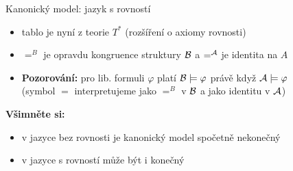 \documentclass{beamer}
\begin{document}
\begin{frame}{Kanonický model: jazyk s rovností}


    \medskip

    \begin{itemize}
        \item tablo je nyní z teorie $T^*$ (rozšíření o axiomy rovnosti)
        \item $=^B$ je opravdu kongruence struktury $\mathcal{B}$ a $=^{\mathcal{A}}$ je identita na $A$
        \item \textbf{Pozorování:} pro lib. formuli $\varphi$ platí \alert{$\mathcal{B}\models\varphi$ právě když $\mathcal{A}\models\varphi$}\\
        (symbol $=$ interpretujeme jako $=^B$ v $\mathcal{B}$ a jako identitu v $\mathcal{A}$)
    \end{itemize}

    \textbf{Všimněte si:}    
    \begin{itemize}
        \item v jazyce bez rovnosti je kanonický model spočetně nekonečný
        \item v jazyce s rovností může být i konečný
    \end{itemize}

\end{frame}
\end{document}
